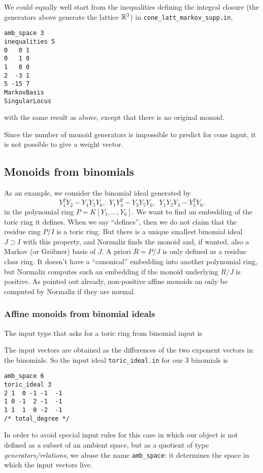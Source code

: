 We could equally well start from the inequalities defining the integral closure (the generators above generate the lattice ${\mathbb R}^3$) in \verb|cone_latt_markov_supp.in|,
\begin{Verbatim}
amb_space 3
inequalities 5
0   0 1
0   1 0
1   0 0
2  -3 1
5 -15 7
MarkovBasis
SingularLocus
\end{Verbatim}
with the same result as above, except that there is no original monoid.

Since the number of monoid generators is impossible to predict for cone input, it is not possible to give a weight vector.

\subsection{Monoids from binomials}\label{binom_ex}

As an example, we consider the binomial ideal generated by
$$
Y_1^2Y_2-Y_4Y_5Y_6,\ \ Y_1Y_4^2-Y_3Y_5Y_6,\ \ Y_1Y_2Y_3-Y_5^2Y_6.
$$
in the polynomial ring $P=K[Y_1,\dots, Y_6]$. We want to find an embedding of the toric ring it defines. When we say ``defines'', then we do not claim that the residue ring  $P/I$ is a toric ring. But there is a unique smallest binomial ideal $J\supset I$ with this property, and Normaliz finds the monoid and, if wanted, also a Markov (or Gröbner) basis of $J$. A priori $R=P/J$ is only defined as a residue class ring. It doesn't have a ``canonical'' embedding into another polynomial ring, but Normaliz computes such an embedding if the monoid underlying $R/J$ is positive. As pointed out already, non-positive affine monoids an only be computed by Normaliz if they are normal.

\subsubsection{Affine monoids from binomial ideals}\label{toric_ideal}
The input type that asks for a toric ring from binomial input is
\begin{itemize}
\end{itemize}
The input vectors are obtained as the differences of the two exponent vectors in the binomials. So the input ideal \verb+toric_ideal.in+ for our $3$ binomials is
\begin{Verbatim}
amb_space 6
toric_ideal 3
2 1  0 -1 -1  -1
1 0 -1  2 -1  -1
1 1  1  0 -2  -1
/* total_degree */
\end{Verbatim}
In order to avoid special input rules for this case in which our object is not defined as a subset of an ambient space, but as a quotient of type \emph{generators/relations}, we abuse the name \verb|amb_space|: it determines the space in which the input vectors live.

